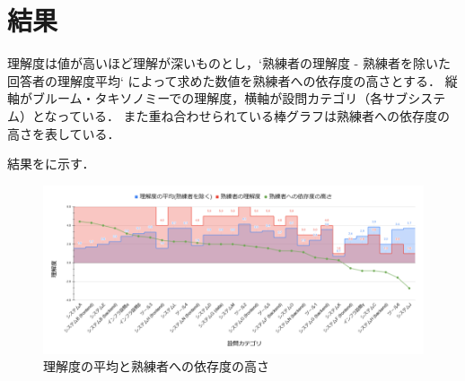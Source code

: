\section{結果}

理解度は値が高いほど理解が深いものとし，`熟練者の理解度 - 熟練者を除いた回答者の理解度平均` によって求めた数値を熟練者への依存度の高さとする．
縦軸がブルーム・タキソノミーでの理解度，横軸が設問カテゴリ（各サブシステム）となっている．
また重ね合わせられている棒グラフは熟練者への依存度の高さを表している．

結果をに示す．

\begin{figure}[t]
	\centering
	\includegraphics[keepaspectratio,width=0.9\linewidth]{img/rikai.png}
	\caption{理解度の平均と熟練者への依存度の高さ}
	\label{img:rikai}
\end{figure}
